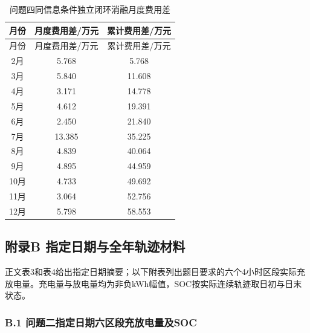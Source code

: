 \documentclass[zihao=-4,a4paper,UTF8,fontset=none]{ctexart}
\begin{document}
\begin{longtable}[]{@{}ccc@{}}
\caption{问题四同信息条件独立闭环消融月度费用差}\label{tab:appendix-A-12}\tabularnewline
\toprule\noalign{}
月份 & 月度费用差/万元 & 累计费用差/万元 \\
\midrule\noalign{}
\endfirsthead
\toprule\noalign{}
月份 & 月度费用差/万元 & 累计费用差/万元 \\
\midrule\noalign{}
\endhead
\bottomrule\noalign{}
\endlastfoot
2月 & 5.768 & 5.768 \\
3月 & 5.840 & 11.608 \\
4月 & 3.171 & 14.778 \\
5月 & 4.612 & 19.391 \\
6月 & 2.450 & 21.840 \\
7月 & 13.385 & 35.225 \\
8月 & 4.839 & 40.064 \\
9月 & 4.895 & 44.959 \\
10月 & 4.733 & 49.692 \\
11月 & 3.064 & 52.756 \\
12月 & 5.798 & 58.553 \\
\end{longtable}

\endgroup

\subsection*{附录B 指定日期与全年轨迹材料}

正文表3和表4给出指定日期摘要；以下附表列出题目要求的六个4小时区段实际充放电量。充电量与放电量均为非负kWh幅值，SOC按实际连续轨迹取日初与日末状态。

\clearpage\subsubsection*{B.1 问题二指定日期六区段充放电量及SOC}

\begingroup\renewcommand{\tablename}{附表}\renewcommand{\thetable}{B-1}
\end{document}
